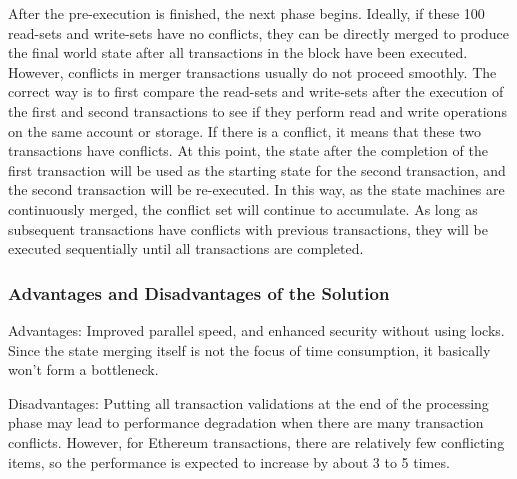 After the pre-execution is finished, the next phase begins. Ideally, if these 100 read-sets and write-sets have no conflicts, they can be directly merged to produce the final world state after all transactions in the block have been executed. However, conflicts in merger transactions usually do not proceed smoothly. The correct way is to first compare the read-sets and write-sets after the execution of the first and second transactions to see if they perform read and write operations on the same account or storage. If there is a conflict, it means that these two transactions have conflicts. At this point, the state after the completion of the first transaction will be used as the starting state for the second transaction, and the second transaction will be re-executed. In this way, as the state machines are continuously merged, the conflict set will continue to accumulate. As long as subsequent transactions have conflicts with previous transactions, they will be executed sequentially until all transactions are completed.

\subsubsection{Advantages and Disadvantages of the Solution}

Advantages: Improved parallel speed, and enhanced security without using locks. Since the state merging itself is not the focus of time consumption, it basically won't form a bottleneck.

Disadvantages: Putting all transaction validations at the end of the processing phase may lead to performance degradation when there are many transaction conflicts. However, for Ethereum transactions, there are relatively few conflicting items, so the performance is expected to increase by about 3 to 5 times.
